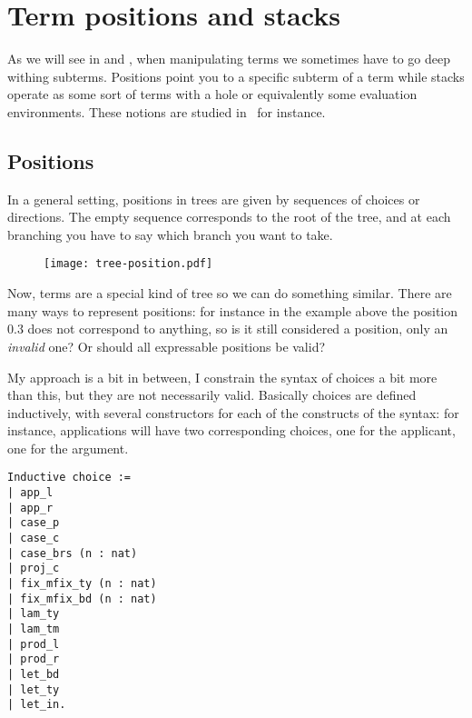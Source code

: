 \chapter{Term positions and stacks}

As we will see in  and , when
manipulating terms we sometimes have to go deep withing subterms.
Positions point you to a specific subterm of a term while stacks operate as
some sort of terms with a hole or equivalently some evaluation environments.
These notions are studied
in~
for instance.

\section{Positions}

In a general setting, positions in trees are given by sequences of choices or
directions. The empty sequence corresponds to the root of the tree, and at each
branching you have to say which branch you want to take.

\begin{figure}[hb]
  \texttt{[image: tree-position.pdf]}
\end{figure}

Now, terms are a special kind of tree so we can do something similar.
There are many ways to represent positions: for instance in the example above
the position \(0.3\) does not correspond to anything, so is it still considered
a position, only an \emph{invalid} one? Or should all expressable positions
be valid?

My approach is a bit in between, I constrain the syntax of choices a bit more
than this, but they are not necessarily valid.
Basically choices are defined inductively, with several constructors for each
of the constructs of the syntax: for instance, applications will have two
corresponding choices, one for the applicant, one for the argument.
\begin{verbatim}
Inductive choice :=
| app_l
| app_r
| case_p
| case_c
| case_brs (n : nat)
| proj_c
| fix_mfix_ty (n : nat)
| fix_mfix_bd (n : nat)
| lam_ty
| lam_tm
| prod_l
| prod_r
| let_bd
| let_ty
| let_in.
\end{verbatim}


